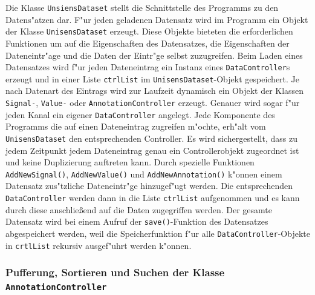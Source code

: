 Die Klasse \verb|UnsiensDataset| stellt die Schnittstelle des Programms zu den Datens"atzen dar.
F"ur jeden geladenen Datensatz wird im Programm ein Objekt der Klasse \verb|UnisensDataset| erzeugt.
Diese Objekte bieteten die erforderlichen Funktionen um auf die Eigenschaften des Datensatzes, die Eigenschaften der Dateneintr"age und die Daten der Eintr"ge selbst zuzugreifen.
Beim Laden eines Datensatzes wird f"ur jeden Dateneintrag ein Instanz eines \verb|DataController|s erzeugt und in einer Liste \verb|ctrlList| im \verb|UnisensDataset|-Objekt gespeichert.
Je nach Datenart des Eintrags wird zur Laufzeit dynamisch ein Objekt der Klassen \verb|Signal-|, \verb|Value-| oder \verb|AnnotationController| erzeugt.
Genauer wird sogar f"ur jeden Kanal ein eigener \verb|DataController| angelegt.
Jede Komponente des Programms die auf einen Dateneintrag zugreifen m"ochte, erh"alt vom \verb|UnisensDataset| den entsprechenden Controller.
Es wird sichergestellt, dass zu jedem Zeitpunkt jedem Dateneintrag genau ein Controllerobjekt zugeordnet ist und keine Duplizierung auftreten kann.
Durch spezielle Funktionen \verb|AddNewSignal()|, \verb|AddNewValue()| und \verb|AddNewAnnotation()| k"onnen einem Datensatz zus"tzliche Dateneintr"ge hinzugef"ugt werden.
Die entsprechenden \verb|DataController| werden dann in die Liste \verb|ctrlList| aufgenommen und es kann durch diese anschlie\ss end auf die Daten zugegriffen werden.
Der gesamte Datensatz wird bei einem Aufruf der \verb|save()|-Funktion des Datensatzes abgespeichert werden, weil die Speicherfunktion f"ur alle \verb|DataController|-Objekte in \verb|crtlList| rekursiv ausgef"uhrt werden k"onnen.

\subsubsection{Pufferung, Sortieren und Suchen der Klasse \texttt{AnnotationController}}


